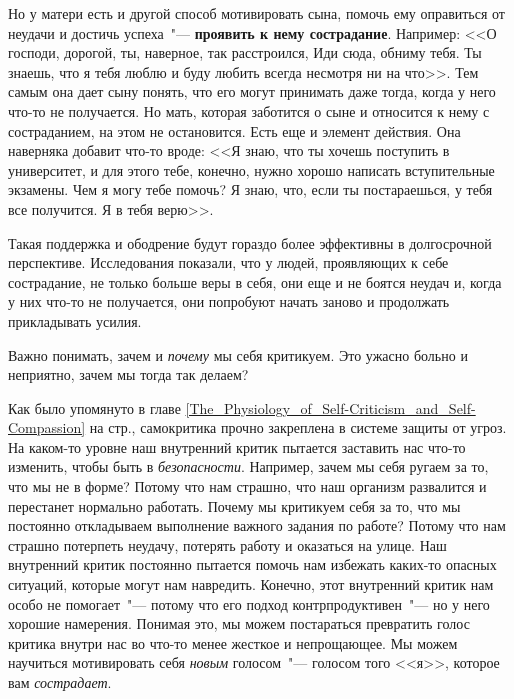 Но у матери есть и другой способ мотивировать сына, помочь ему оправиться от неудачи и достичь успеха~"--- \textbf{проявить к нему сострадание}. Например: <<О господи, дорогой, ты, наверное, так расстроился, Иди сюда, обниму тебя. Ты знаешь, что я тебя люблю и буду любить всегда несмотря ни на что>>. Тем самым она дает сыну понять, что его могут принимать даже тогда, когда у него что-то не получается. Но мать, которая заботится о сыне и относится к нему с состраданием, на этом не остановится. Есть еще и элемент действия. Она наверняка добавит что-то вроде: <<Я знаю, что ты хочешь поступить в университет, и для этого тебе, конечно, нужно хорошо написать вступительные экзамены. Чем я могу тебе помочь? Я знаю, что, если ты постараешься, у тебя все получится. Я в тебя верю>>.
		
Такая поддержка и ободрение будут гораздо более эффективны в долгосрочной перспективе. Исследования показали, что у людей, проявляющих к себе сострадание, не только больше веры в себя\cite{73}, они еще и не боятся неудач\cite{74} и, когда у них что-то не получается, они попробуют начать заново и продолжать прикладывать усилия\cite{75}.

Важно понимать, зачем и \emph{почему} мы себя критикуем. Это ужасно больно и неприятно, зачем мы тогда так делаем? 

Как было упомянуто в главе \ref{The_Physiology_of_Self-Criticism_and_Self-Compassion} на стр.\:\pageref{The_Physiology_of_Self-Criticism_and_Self-Compassion}, самокритика прочно закреплена в системе защиты от угроз. На каком-то уровне наш внутренний критик пытается заставить нас что-то изменить, чтобы быть в \emph{безопасности}. Например, зачем мы себя ругаем за то, что мы не в форме? Потому что нам страшно, что наш организм развалится и перестанет нормально работать. Почему мы критикуем себя за то, что мы постоянно откладываем выполнение важного задания по работе? Потому что нам страшно потерпеть неудачу, потерять работу и оказаться на улице. Наш внутренний критик постоянно пытается помочь нам избежать каких-то опасных ситуаций, которые могут нам навредить. Конечно, этот внутренний критик нам особо не помогает~"--- потому что его подход контрпродуктивен~"--- но у него хорошие намерения. Понимая это, мы можем постараться превратить голос критика внутри нас во что-то менее жесткое и непрощающее. Мы можем научиться мотивировать себя \emph{новым} голосом~"--- голосом того <<я>>, которое вам \emph{сострадает}. 

